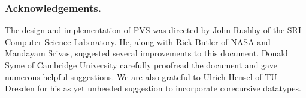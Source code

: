 \documentclass[11pt,twoside]{book}
\begin{document}
\subsubsection{Acknowledgements. } The design and implementation of PVS
was directed by John Rushby of the SRI
Computer Science Laboratory.    He, along with Rick Butler of NASA
and Mandayam Srivas, suggested several improvements to this document.
Donald Syme of Cambridge University carefully proofread the document
and gave numerous helpful suggestions.  We are also grateful to
Ulrich Hensel of TU Dresden for his as yet unheeded suggestion
to incorporate corecursive datatypes.  




\end{document}
